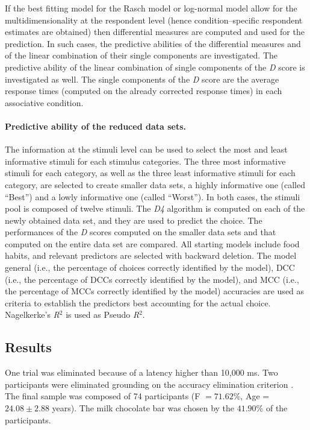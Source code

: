 \documentclass[12pt]{book}
\begin{document}
If the best fitting model for the Rasch model or log-normal model allow for the multidimensionality at the respondent level (hence condition--specific respondent estimates are obtained) then differential measures are computed and used for the prediction. 
In such cases, the predictive abilities of the differential measures and of the linear combination of their single components are investigated. 
The predictive ability of the linear combination of single components of the \emph{D} score is investigated as well. 
The single components of the \emph{D} score are the average response times (computed on the already corrected response times) in each associative condition.

\paragraph{Predictive ability of the reduced data sets.}

The information at the stimuli level can be used to select the most and least informative stimuli for each stimulus categories. 
The three most informative stimuli for each category, as well as the three least informative stimuli for each category, are selected to create smaller data sets, a highly informative one (called ``Best'') and a lowly informative one (called ``Worst''). 
In both cases, the stimuli pool is composed of twelve stimuli. 
The \emph{D4} algorithm is computed on each of the newly obtained data set, and  they are used to predict the choice. The performances of the \emph{D} scores computed on the smaller data sets and that computed on the entire data set are compared.
All starting models include food habits, and relevant predictors are selected with backward deletion.
The model general (i.e., the percentage of choices correctly identified by the model), DCC (i.e., the percentage of DCCs correctly identified by the model), and MCC (i.e., the percentage of MCCs correctly identified by the model) accuracies are used as criteria to establish the predictors best accounting for the actual choice.
Nagelkerke’s \emph{R}$^2$ \cite{nagel} is used as Pseudo \emph{R}$^2$.


\subsection{Results}
One trial was eliminated because of a latency higher than 10,000 ms. Two participants were eliminated grounding on the accuracy elimination criterion \cite{Nosek2002}. The final sample was composed of 74 participants  (F $=71.62$\%, Age = $24.08 \pm2.88$ years). 
The milk chocolate bar was chosen by the $41.90$\% of the participants.
\end{document}
